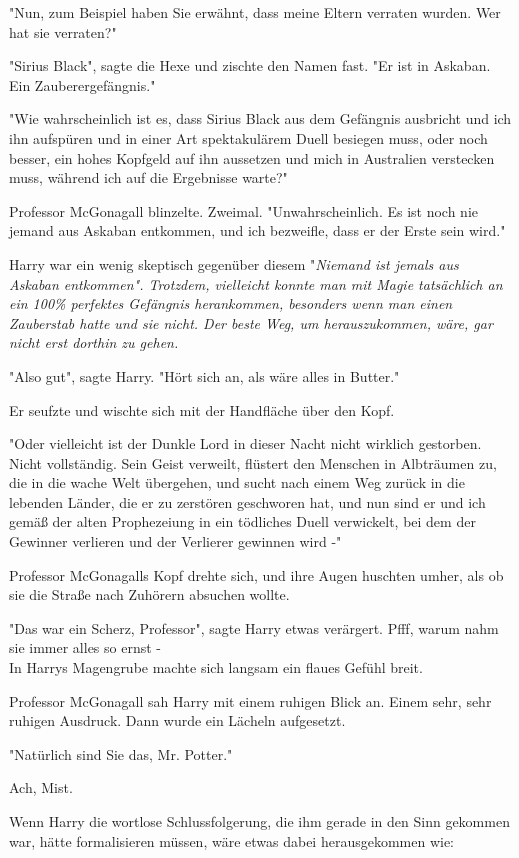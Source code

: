 {"Nun, zum Beispiel haben Sie erwähnt, dass meine Eltern verraten wurden. Wer hat sie verraten?"

"Sirius Black", sagte die Hexe und zischte den Namen fast. "Er ist in Askaban. Ein Zauberergefängnis."

"Wie wahrscheinlich ist es, dass Sirius Black aus dem Gefängnis ausbricht und ich ihn aufspüren und in einer Art spektakulärem Duell besiegen muss, oder noch besser, ein hohes Kopfgeld auf ihn aussetzen und mich in Australien verstecken muss, während ich auf die Ergebnisse warte?"

Professor McGonagall blinzelte. Zweimal. "Unwahrscheinlich. Es ist noch nie jemand aus Askaban entkommen, und ich bezweifle, dass er der Erste sein wird."

Harry war ein wenig skeptisch gegenüber diesem "\emph{Niemand ist jemals aus Askaban entkommen". Trotzdem, vielleicht konnte man mit Magie tatsächlich an ein 100\% perfektes Gefängnis herankommen, besonders wenn man einen Zauberstab hatte und sie nicht. Der beste Weg, um herauszukommen, wäre, gar nicht erst dorthin zu gehen.}

"Also gut", sagte Harry. "Hört sich an, als wäre alles in Butter."

Er seufzte und wischte sich mit der Handfläche über den Kopf.

"Oder vielleicht ist der Dunkle Lord in dieser Nacht nicht wirklich gestorben. Nicht vollständig. Sein Geist verweilt, flüstert den Menschen in Albträumen zu, die in die wache Welt übergehen, und sucht nach einem Weg zurück in die lebenden Länder, die er zu zerstören geschworen hat, und nun sind er und ich gemäß der alten Prophezeiung in ein tödliches Duell verwickelt, bei dem der Gewinner verlieren und der Verlierer gewinnen wird -"

Professor McGonagalls Kopf drehte sich, und ihre Augen huschten umher, als ob sie die Straße nach Zuhörern absuchen wollte.

"Das war ein Scherz, Professor", sagte Harry etwas verärgert. Pfff, warum nahm sie immer alles so ernst -\\ In Harrys Magengrube machte sich langsam ein flaues Gefühl breit.

Professor McGonagall sah Harry mit einem ruhigen Blick an. Einem sehr, sehr ruhigen Ausdruck. Dann wurde ein Lächeln aufgesetzt.

"Natürlich sind Sie das, Mr. Potter."

Ach, Mist.

Wenn Harry die wortlose Schlussfolgerung, die ihm gerade in den Sinn gekommen war, hätte formalisieren müssen, wäre etwas dabei herausgekommen wie:

}
